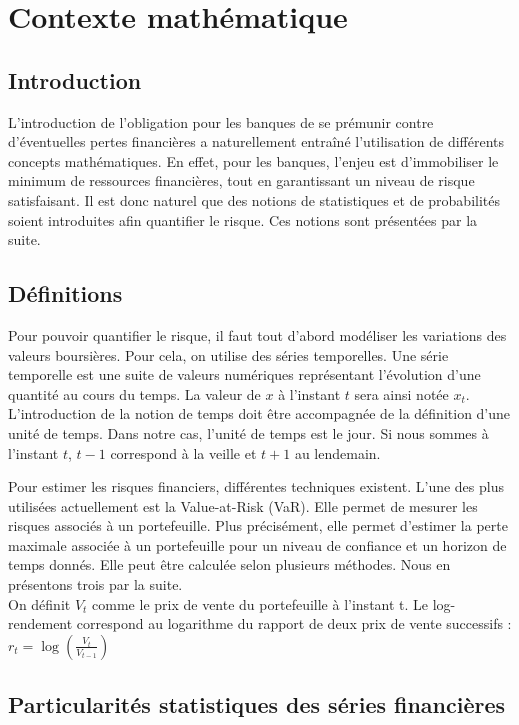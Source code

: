 \chapter{Contexte mathématique}

	\section{Introduction}

	L’introduction de l’obligation pour les banques de se prémunir contre d’éventuelles pertes financières a naturellement entraîné l’utilisation de différents concepts mathématiques. En effet, pour les banques, l’enjeu est d’immobiliser le minimum de ressources financières, tout en garantissant un niveau de risque satisfaisant. Il est donc naturel que des notions de statistiques et de probabilités soient introduites afin quantifier le risque. Ces notions sont présentées par la suite.


	\section{Définitions}

		Pour pouvoir quantifier le risque, il faut tout d'abord modéliser les variations des valeurs boursières. Pour cela, on utilise des séries temporelles. Une série temporelle est une suite de valeurs numériques représentant l'évolution d'une quantité au cours du temps. La valeur de $x$ à l'instant $t$ sera ainsi notée $x_t$. L'introduction de la notion de temps doit être accompagnée de la définition d'une unité de temps. Dans notre cas, l'unité de temps est le jour. Si nous sommes à l'instant $t$, $t-1$ correspond à la veille et $t+1$ au lendemain.

		Pour estimer les risques financiers, différentes techniques existent. L'une des plus utilisées actuellement est la Value-at-Risk (VaR). Elle permet de mesurer les risques associés à un \gls{portefeuille}.
		Plus précisément, elle permet d'estimer la perte maximale associée à un portefeuille pour un niveau de confiance et un horizon de temps donnés. Elle peut être calculée selon plusieurs méthodes. Nous en présentons trois par la suite.\\
		On définit $V_t$ comme le prix de vente du \gls{portefeuille} à l'instant t. Le log-rendement correspond au logarithme du rapport de deux prix de vente successifs :
		$r_t = \log\left(\frac{V_t}{V_{t-1}}\right)$


	\section{Particularités statistiques des séries financières}


